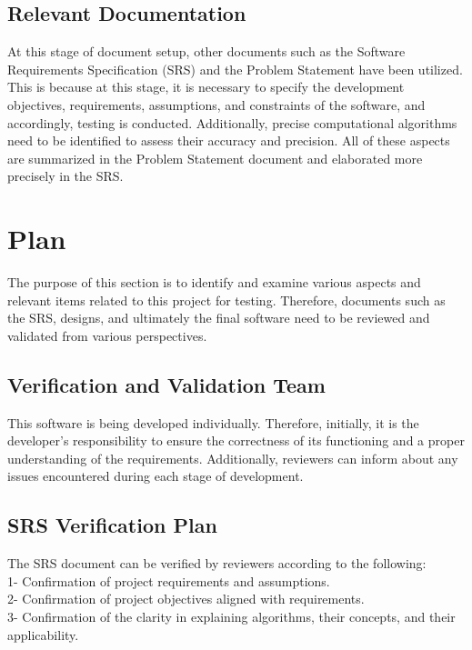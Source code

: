 \documentclass[12pt, titlepage]{article}
\begin{document}
\subsection{Relevant Documentation}

At this stage of document setup, other documents such as the Software Requirements Specification (SRS) and the Problem Statement have been utilized. This is because at this stage, it is necessary to specify the development objectives, requirements, assumptions, and constraints of the software, and accordingly, testing is conducted. Additionally, precise computational algorithms need to be identified to assess their accuracy and precision. All of these aspects are summarized in the Problem Statement document and elaborated more precisely in the SRS.

\citet{SRS}

\section{Plan}
The purpose of this section is to identify and examine various aspects and relevant items related to this project for testing. Therefore, documents such as the SRS, designs, and ultimately the final software need to be reviewed and validated from various perspectives.

\subsection{Verification and Validation Team}

This software is being developed individually. Therefore, initially, it is the developer's responsibility to ensure the correctness of its functioning and a proper understanding of the requirements. Additionally, reviewers can inform about any issues encountered during each stage of development.

\subsection{SRS Verification Plan}

The SRS document can be verified by reviewers according to the following:\\
1- Confirmation of project requirements and assumptions.\\
2- Confirmation of project objectives aligned with requirements.\\
3- Confirmation of the clarity in explaining algorithms, their concepts, and their applicability.
\end{document}
